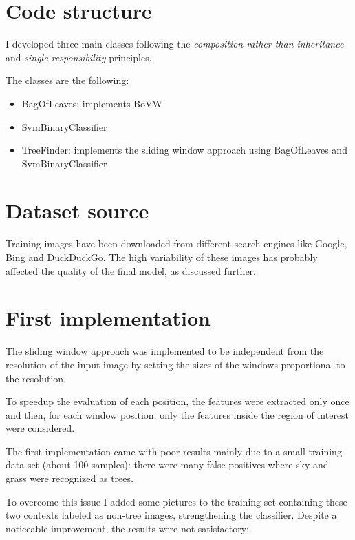 \documentclass[]{report}
\begin{document}
\section{Code structure}
I developed three main classes following the \textit{composition rather than inheritance} and \textit{single responsibility} principles.

The classes are the following:

\begin{itemize}
	\item  BagOfLeaves: implements BoVW
	\item SvmBinaryClassifier
	\item TreeFinder: implements the sliding window approach using BagOfLeaves and SvmBinaryClassifier
\end{itemize}

\section{Dataset source}
Training images have been downloaded from different search engines like Google, Bing and DuckDuckGo.
The high variability of these images has probably affected the quality of the final model, as discussed further.

\newpage
\section{First implementation}
The sliding window approach was implemented to be independent from the resolution of the input image by setting the sizes of the windows proportional to the resolution.

To speedup the evaluation of each position, the features were extracted only once and then, for each window position, only the features inside the region of interest were considered.

The first implementation came with poor results mainly due to a small training data-set (about 100 samples): there were many false positives where sky and grass were recognized as trees. 

To overcome this issue I added some pictures to the training set containing these two contexts labeled as non-tree images, strengthening the classifier. 
Despite a noticeable  improvement, the results were not satisfactory:

\vspace{0.5cm}
\end{document}
